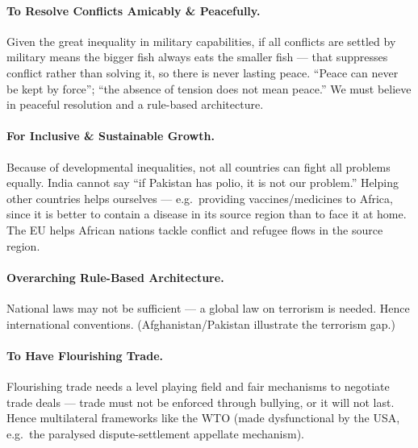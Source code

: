 \paragraph{To Resolve Conflicts Amicably \& Peacefully.}
\begin{KeyConcept}
Given the great inequality in military capabilities, if all conflicts are settled by military means the bigger fish always eats the smaller fish --- that suppresses conflict rather than solving it, so there is never lasting peace. ``Peace can never be kept by force''; ``the absence of tension does not mean peace.'' We must believe in peaceful resolution and a rule-based architecture.
\end{KeyConcept}

\paragraph{For Inclusive \& Sustainable Growth.}
\begin{KeyConcept}
Because of developmental inequalities, not all countries can fight all problems equally. India cannot say ``if Pakistan has polio, it is not our problem.'' Helping other countries helps ourselves --- e.g.\ providing vaccines/medicines to Africa, since it is better to contain a disease in its source region than to face it at home. The EU helps African nations tackle conflict and refugee flows in the source region.
\end{KeyConcept}

\paragraph{Overarching Rule-Based Architecture.}
\begin{KeyConcept}
National laws may not be sufficient --- a global law on terrorism is needed. Hence international conventions. (Afghanistan/Pakistan illustrate the terrorism gap.)
\end{KeyConcept}

\paragraph{To Have Flourishing Trade.}
\begin{KeyConcept}
Flourishing trade needs a level playing field and fair mechanisms to negotiate trade deals --- trade must not be enforced through bullying, or it will not last. Hence multilateral frameworks like the WTO (made dysfunctional by the USA, e.g.\ the paralysed dispute-settlement appellate mechanism).
\end{KeyConcept}

